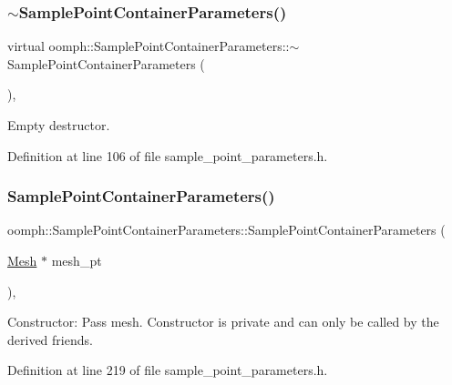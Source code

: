 \subsubsection{\texorpdfstring{$\sim$\+Sample\+Point\+Container\+Parameters()}{~SamplePointContainerParameters()}}
{\footnotesize\ttfamily virtual oomph\+::\+Sample\+Point\+Container\+Parameters\+::$\sim$\+Sample\+Point\+Container\+Parameters (\begin{DoxyParamCaption}{ }\end{DoxyParamCaption})\hspace{0.3cm}{\ttfamily [inline]}, {\ttfamily [virtual]}}



Empty destructor. 



Definition at line 106 of file sample\+\_\+point\+\_\+parameters.\+h.

\mbox{\label{classoomph_1_1SamplePointContainerParameters_a2513e0c918a2ec86c05ac39318c1c6c3}} 
\subsubsection{\texorpdfstring{Sample\+Point\+Container\+Parameters()}{SamplePointContainerParameters()}\hspace{0.1cm}{\footnotesize\ttfamily [2/3]}}
{\footnotesize\ttfamily oomph\+::\+Sample\+Point\+Container\+Parameters\+::\+Sample\+Point\+Container\+Parameters (\begin{DoxyParamCaption}\item[{\hyperlink{classoomph_1_1Mesh}{Mesh} $\ast$}]{mesh\+\_\+pt }\end{DoxyParamCaption})\hspace{0.3cm}{\ttfamily [inline]}, {\ttfamily [private]}}



Constructor\+: Pass mesh. Constructor is private and can only be called by the derived friends. 



Definition at line 219 of file sample\+\_\+point\+\_\+parameters.\+h.

